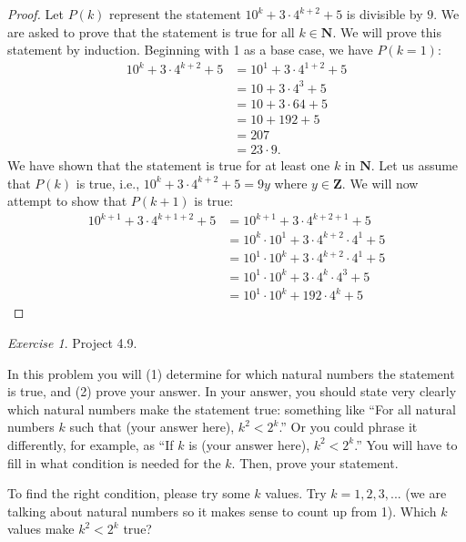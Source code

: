 \documentclass[12pt,oneside]{amsart}
\theoremstyle{remark}
\newtheorem{exer}{Exercise}
\newcommand{\bfN}{\mathbf{N}}
\newcommand{\bfZ}{\mathbf{Z}}
\begin{document}
\begin{proof}
Let $P(k)$ represent the statement $10^k + 3 \cdot 4^{k+2} + 5$ is divisible by $9$. We are asked to prove that the statement is true for all $k \in \bfN$.  We will prove this statement by induction. Beginning with 1 as a base case, we have $P(k = 1)$:
\begin{align*}
10^k + 3 \cdot 4^{k+2} + 5 &= 10^1 + 3 \cdot 4^{1 + 2} + 5 \\
                           &= 10 + 3 \cdot 4^3 + 5 \\
                           &= 10 + 3 \cdot 64 + 5 \\
                           &= 10 + 192 + 5 \\
                           &= 207 \\
                           &= 23 \cdot 9.
\end{align*}
We have shown that the statement is true for at least one $k$ in $\bfN$. Let us assume that $P(k)$ is true, i.e., $10^k + 3 \cdot 4^{k+2} + 5 = 9y$ where $y \in \bfZ$. We will now attempt to show that $P(k + 1)$ is true:
\begin{align*}
10^{k + 1} + 3 \cdot 4^{k + 1 + 2} + 5 &= 10^{k + 1} + 3 \cdot 4^{k + 2 + 1} + 5 \\
                                       &= 10^k \cdot 10^1 + 3 \cdot 4^{k + 2} \cdot 4^1 + 5 \\
                                       &= 10^1 \cdot 10^k + 3 \cdot 4^{k + 2} \cdot 4^1 + 5 \\
                                       &= 10^1 \cdot 10^k + 3 \cdot 4^k \cdot 4^3 + 5 \\
                                       &= 10^1 \cdot 10^k + 192 \cdot 4^k + 5
\end{align*}

\end{proof}

%
%
%
%

\newpage
\begin{exer}
Project 4.9.

In this problem you will (1) determine for which natural numbers the statement is true, and (2) prove your answer. In your answer, you should state very clearly which natural numbers make the statement true: something like “For all natural numbers $k$ such that (your answer here), $k^2 < 2^k$.” Or you could phrase it differently, for example, as “If $k$ is (your answer here), $k^2 < 2^k$.” You will have to fill in what condition is needed for the $k$. Then, prove your statement.

To find the right condition, please try some $k$ values. Try  $k = 1, 2, 3, ...$ (we are talking about natural numbers so it makes sense to count up from 1). Which $k$ values make
$k^2 < 2^k$ true?
\end{exer}
\end{document}
